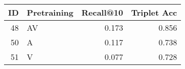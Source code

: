 \begin{tabular}{rlrr}
\toprule
 ID & Pretraining &  Recall@10 &  Triplet Acc \\
\midrule
 48 &          AV &      0.173 &        0.856 \\
 50 &           A &      0.117 &        0.738 \\
 51 &           V &      0.077 &        0.728 \\
\bottomrule
\end{tabular}
